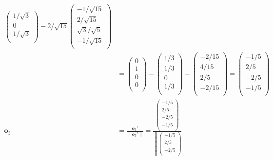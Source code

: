 \documentclass[dvipdfmx]{jsarticle}
\begin{document}
\begin{align*}
\begin{pmatrix}
  {1}/{\sqrt{3}} \\
  0 \\
  {1}/{\sqrt{3}} \\
\end{pmatrix} - {2}/{\sqrt{15}}\begin{pmatrix}
   - {1}/{\sqrt{15}} \\
  {2}/{\sqrt{15}} \\
  {\sqrt{3}}/{\sqrt{5}} \\
   - {1}/{\sqrt{15}} \\
\end{pmatrix}\\
&= \begin{pmatrix}
  0 \\
  1 \\
  0 \\
  0 \\
\end{pmatrix} - \begin{pmatrix}
  {1}/{3} \\
  {1}/{3} \\
  0 \\
  {1}/{3} \\
\end{pmatrix} - \begin{pmatrix}
   - {2}/{15} \\
  {4}/{15} \\
  {2}/{5} \\
   - {2}/{15} \\
\end{pmatrix} = \begin{pmatrix}
   - {1}/{5} \\
  {2}/{5} \\
   - {2}/{5} \\
   - {1}/{5} \\
\end{pmatrix}\\
\mathbf{o}_{3} &= \frac{\mathbf{o}_{3}'}{\left\| \mathbf{o}_{3}' \right\|} = \frac{\begin{pmatrix}
   - {1}/{5} \\
  {2}/{5} \\
   - {2}/{5} \\
   - {1}/{5} \\
\end{pmatrix}}{\left\| \begin{pmatrix}
   - {1}/{5} \\
  {2}/{5} \\
   - {2}/{5} \\

\end{pmatrix}}
\end{align*}
\end{document}
